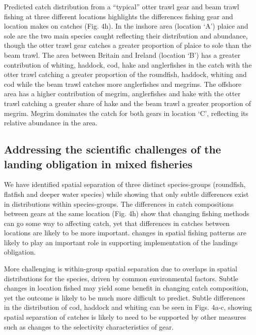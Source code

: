 \documentclass{nature}
\begin{document}
\begin{linenumbers}
Predicted catch distribution from a ``typical'' otter trawl gear and beam trawl
fishing at three different locations highlights the differences fishing gear
and location makes on catches (Fig. 4h). In the inshore area (location `A') plaice and sole are
the two main species caught reflecting their distribution and
abundance, though the otter trawl gear catches a greater proportion of plaice
to sole than the beam trawl. The area between Britain and Ireland (location
`B') has a greater contribution of whiting, haddock, cod, hake and anglerfishes
in the catch with the otter trawl catching a greater proportion of the
roundfish, haddock, whiting and cod while the beam trawl catches more
anglerfishes and megrims. The offshore area has a higher contribution of
megrim, anglerfishes and hake with the otter trawl catching a greater share of
hake and the beam trawl a greater proportion of megrim. Megrim dominates the
catch for both gears in location `C', reflecting its relative abundance in the
area.  

\subsection{Addressing the scientific challenges of the landing obligation in
	mixed fisheries}  We have
identified spatial separation of three distinct species-groups (roundfish,
flatfish and deeper water species) while showing that only subtle differences
exist in distributions within species-groups. The differences in catch
compositions between gears at the same location (Fig. 4h) show that changing
fishing methods can go some way to affecting catch, yet that differences in
catches between locations are likely to be more important.  changes in spatial fishing patterns
are likely to play an important role in supporting implementation of the
landings obligation.

More challenging is within-group spatial separation due to
overlaps in spatial distributions for the species, driven
by common environmental factors. Subtle changes in location fished may yield
some benefit in changing catch composition, yet the outcome is likely to be
much more difficult to predict. Subtle differences in the
distribution of cod, haddock and whiting can be seen in Figs. 4a-c, showing
spatial separation of catches is likely to need to be supported by other measures such as changes to
the selectivity characteristics of gear\cite{Santos2016}. 


\end{linenumbers}
\end{document}

